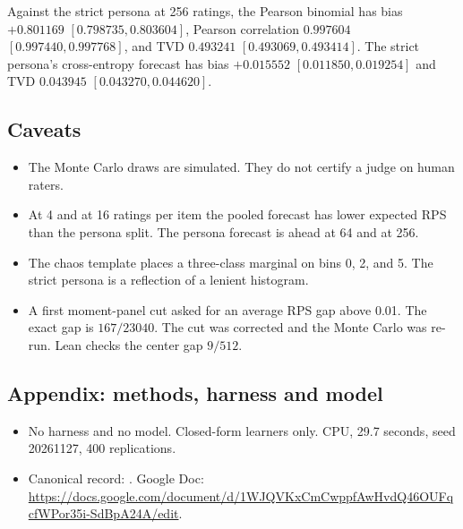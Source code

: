 Against the strict persona at 256 ratings, the Pearson binomial has bias \(+0.801169\) \([0.798735, 0.803604]\), Pearson correlation \(0.997604\) \([0.997440, 0.997768]\), and TVD \(0.493241\) \([0.493069, 0.493414]\). The strict persona's cross-entropy forecast has bias \(+0.015552\) \([0.011850, 0.019254]\) and TVD \(0.043945\) \([0.043270, 0.044620]\).

\subsection*{Caveats}
\begin{itemize}
\item The Monte Carlo draws are simulated. They do not certify a judge on human raters.
\item At 4 and at 16 ratings per item the pooled forecast has lower expected RPS than the persona split. The persona forecast is ahead at 64 and at 256.
\item The chaos template places a three-class marginal on bins 0, 2, and 5. The strict persona is a reflection of a lenient histogram.
\item A first moment-panel cut asked for an average RPS gap above 0.01. The exact gap is \(167/23040\). The cut was corrected and the Monte Carlo was re-run. Lean checks the center gap \(9/512\).
\end{itemize}

\subsection*{Appendix: methods, harness and model}
\begin{itemize}
\item No harness and no model. Closed-form learners only. CPU, 29.7 seconds, seed 20261127, 400 replications.
\item Canonical record: . Google Doc: \url{https://docs.google.com/document/d/1WJQVKxCmCwppfAwHvdQ46OUFqcfWPor35i-SdBpA24A/edit}.
\end{itemize}
